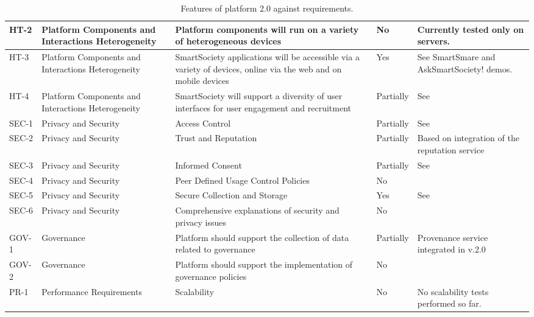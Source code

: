\begin{sidewaystable}
{\begin{tabular}{|p{1.1cm}|p{4cm}|p{6.7cm}|p{1.5cm}|p{6.2cm}|}
HT-2 & Platform Components and Interactions Heterogeneity & Platform components will run on a variety of heterogeneous devices & No & Currently tested only on servers.\\ \hline
HT-3  & Platform Components and Interactions Heterogeneity & SmartSociety applications will be accessible via a variety of devices, online via the web and on mobile devices & Yes & See SmartSmare and AskSmartSociety! demos.\\ \hline
HT-4  & Platform Components and Interactions Heterogeneity & SmartSociety  will support a diversity of user interfaces for user engagement and recruitment & Partially & See~\cite{D9.3}\\ \hline
SEC-1 & Privacy and Security & Access Control & Partially & See~\cite{D4.3}\\  \hline
SEC-2 &  Privacy and Security & Trust and Reputation & Partially & Based on integration of the reputation service \\ \hline
SEC-3 &  Privacy and Security & Informed Consent & Partially & See~\cite{D4.3}\\ \hline
SEC-4 &  Privacy and Security & Peer Defined Usage Control Policies & No & \\ \hline
SEC-5 &  Privacy and Security & Secure Collection and Storage & Yes & See~\cite{D4.3}\\ \hline
SEC-6 &  Privacy and Security & Comprehensive explanations of security and privacy issues & No & \\ \hline
GOV-1 & Governance & Platform should support the collection of data related to governance & Partially & Provenance service integrated in v.2.0\\ \hline
GOV-2 & Governance  &Platform should support the implementation of governance policies & No & \\ \hline
PR-1 & Performance Requirements & Scalability & No & No scalability tests performed so far.\\ \hline
\end{tabular}
}
\caption{Features of platform 2.0 against requirements.}
\label{tab:req}
\end{sidewaystable}

